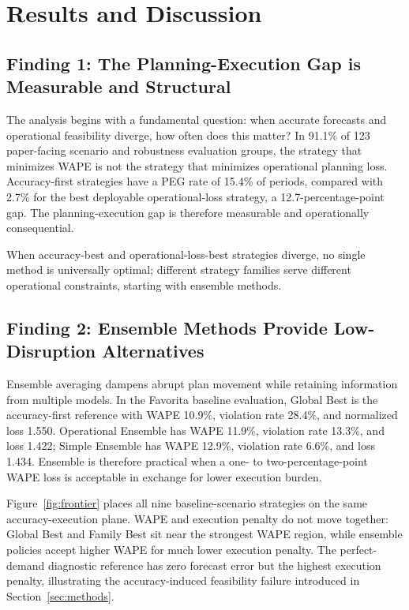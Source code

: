 \section{Results and Discussion}
\label{sec:results}

\subsection{Finding 1: The Planning-Execution Gap is Measurable and Structural}

The analysis begins with a fundamental question: when accurate forecasts and operational feasibility diverge, how often does this matter? In 91.1\% of 123 paper-facing scenario and robustness evaluation groups, the strategy that minimizes WAPE is not the strategy that minimizes operational planning loss. Accuracy-first strategies have a PEG rate of 15.4\% of periods, compared with 2.7\% for the best deployable operational-loss strategy, a 12.7-percentage-point gap. The planning-execution gap is therefore measurable and operationally consequential.

When accuracy-best and operational-loss-best strategies diverge, no single method is universally optimal; different strategy families serve different operational constraints, starting with ensemble methods.

\subsection{Finding 2: Ensemble Methods Provide Low-Disruption Alternatives}

Ensemble averaging dampens abrupt plan movement while retaining information from multiple models. In the Favorita baseline evaluation, Global Best is the accuracy-first reference with WAPE 10.9\%, violation rate 28.4\%, and normalized loss 1.550. Operational Ensemble has WAPE 11.9\%, violation rate 13.3\%, and loss 1.422; Simple Ensemble has WAPE 12.9\%, violation rate 6.6\%, and loss 1.434. Ensemble is therefore practical when a one- to two-percentage-point WAPE loss is acceptable in exchange for lower execution burden.

Figure~\ref{fig:frontier} places all nine baseline-scenario strategies on the same accuracy-execution plane. WAPE and execution penalty do not move together: Global Best and Family Best sit near the strongest WAPE region, while ensemble policies accept higher WAPE for much lower execution penalty. The perfect-demand diagnostic reference has zero forecast error but the highest execution penalty, illustrating the accuracy-induced feasibility failure introduced in Section~\ref{sec:methods}.

